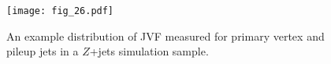 
\begin{figure}
\centering
\texttt{[image: fig\_26.pdf]}
\label{fig:jet-reconstruction:jvf}
\caption{An example distribution of JVF measured for primary vertex and pileup jets in a $Z$+jets simulation sample.}
\end{figure}



